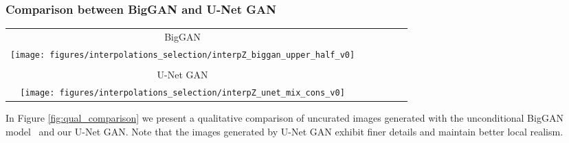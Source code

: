 \documentclass[10pt,twocolumn,letterpaper]{article}
\begin{document}
\subsubsection*{Comparison between BigGAN and U-Net GAN}
\begin{figure*}
\begin{centering}
\setlength{\tabcolsep}{0.1em}
\renewcommand{\arraystretch}{1.0}
\par\end{centering}
\begin{centering}
\hfill{}\begin{tabular}{c@{\hskip 0.05in}c@{\hskip 0.05in}c@{\hskip 0.05in}c@{\hskip 0.05in}c@{\hskip 0.05in}c}
 
BigGAN \tabularnewline
\texttt{[image: figures/interpolations\_selection/interpZ\_biggan\_upper\_half\_v0]}\tabularnewline
\tabularnewline
U-Net GAN \tabularnewline
\texttt{[image: figures/interpolations\_selection/interpZ\_unet\_mix\_cons\_v0]}

\end{tabular}\hfill{}
\par\end{centering}
\caption{\label{fig:qual_comparison} Qualitative comparison of uncurated images generated with the unconditional BigGAN model (top) and our U-Net GAN (bottom) on FFHQ with resolution $256 \times 256$. Note that the images generated by U-Net GAN exhibit finer details and maintain better local realism.} \vspace{0em}
\end{figure*}
 In Figure \ref{fig:qual_comparison} we present a qualitative comparison of uncurated images generated with the unconditional BigGAN model~\cite{Brock2019} and our U-Net GAN. Note that the images generated by U-Net GAN exhibit finer details and maintain better local realism.
\end{document}
